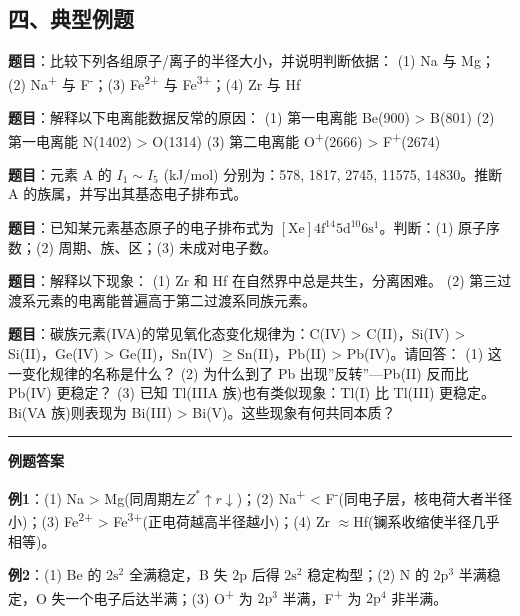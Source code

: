 \documentclass[a4paper,11pt]{ctexart}
\newcommand{\箭}{\ensuremath{\rightarrow}}
\newcommand{\左箭}{\ensuremath{\leftarrow}}
\newcommand{\上箭}{\ensuremath{\uparrow}}
\newcommand{\下箭}{\ensuremath{\downarrow}}
\newcommand{\衡}{\ensuremath{\rightleftharpoons}}
\newcommand{\双箭}{\ensuremath{\leftrightarrow}}
\newcommand{\约等于}{\ensuremath{\approx}}
\newcommand{\小于等于}{\ensuremath{\leq}}
\newcommand{\大于等于}{\ensuremath{\geq}}
\newcommand{\不等于}{\ensuremath{\neq}}
\newcommand{\西格马}{\ensuremath{\sigma}}
\newcommand{\派}{\ensuremath{\pi}}
\begin{document}
\subsection{四、典型例题}\label{ux56dbux5178ux578bux4f8bux9898}

\textbf{题目}：比较下列各组原子/离子的半径大小，并说明判断依据：
(1) Na 与 Mg；(2) Na\textsuperscript{+} 与 F\textsuperscript{-}；(3) Fe\textsuperscript{2+} 与 Fe\textsuperscript{3+}；(4) Zr 与 Hf

\textbf{题目}：解释以下电离能数据反常的原因：
(1) 第一电离能 Be(900) \textgreater{} B(801)
(2) 第一电离能 N(1402) \textgreater{} O(1314)
(3) 第二电离能 O\textsuperscript{+}(2666) \textgreater{} F\textsuperscript{+}(2674)

\textbf{题目}：元素 A 的 \(I_1\sim I_5\) (kJ/mol) 分别为：578, 1817, 2745, 11575, 14830。推断 A 的族属，并写出其基态电子排布式。

\textbf{题目}：已知某元素基态原子的电子排布式为 \([\mathrm{Xe}] 4\mathrm{f}^{14} 5\mathrm{d}^{10} 6\mathrm{s}^1\)。判断：(1) 原子序数；(2) 周期、族、区；(3) 未成对电子数。

\textbf{题目}：解释以下现象：
(1) Zr 和 Hf 在自然界中总是共生，分离困难。
(2) 第三过渡系元素的电离能普遍高于第二过渡系同族元素。

\textbf{题目}：碳族元素(IVA)的常见氧化态变化规律为：C(IV) \textgreater{} C(II)，Si(IV) \textgreater{} Si(II)，Ge(IV) \textgreater{} Ge(II)，Sn(IV) \大于等于 Sn(II)，Pb(II) \textgreater{} Pb(IV)。请回答：
(1) 这一变化规律的名称是什么？
(2) 为什么到了 Pb 出现''反转''---Pb(II) 反而比 Pb(IV) 更稳定？
(3) 已知 Tl(IIIA 族)也有类似现象：Tl(I) 比 Tl(III) 更稳定。Bi(VA 族)则表现为 Bi(III) \textgreater{} Bi(V)。这些现象有何共同本质？

\begin{center}\rule{0.5\linewidth}{0.5pt}\end{center}

\textbf{例题答案}

\textbf{例1}：(1) Na \textgreater{} Mg(同周期左 \(Z^*\)\上箭 \(r\)\下箭)；(2) Na\textsuperscript{+} \textless{} F\textsuperscript{-}(同电子层，核电荷大者半径小)；(3) Fe\textsuperscript{2+} \textgreater{} Fe\textsuperscript{3+}(正电荷越高半径越小)；(4) Zr \约等于 Hf(镧系收缩使半径几乎相等)。

\textbf{例2}：(1) Be 的 \(2\mathrm{s}^2\) 全满稳定，B 失 \(2\mathrm{p}\) 后得 \(2\mathrm{s}^2\) 稳定构型；(2) N 的 \(2\mathrm{p}^3\) 半满稳定，O 失一个电子后达半满；(3) O\textsuperscript{+} 为 \(2\mathrm{p}^3\) 半满，F\textsuperscript{+} 为 \(2\mathrm{p}^4\) 非半满。
\end{document}

